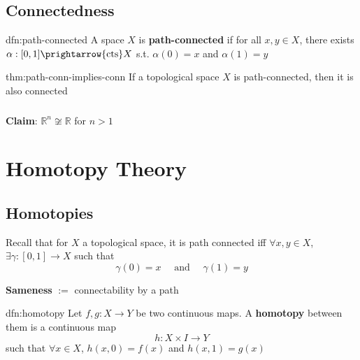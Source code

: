 \documentclass{article}
\begin{document}
\newpage
\subsection{Connectedness}

\begin{dfn}{dfn:path-connected}{}
    A space $X$ is \textbf{path-connected} if for all $x, y\in X$, there exists $\alpha : [0,1] \prightarrow{\text{cts}} X$ s.t. $\alpha(0) = x$ and $\alpha(1) = y$
\end{dfn}

\begin{thm}[]{thm:path-conn-implies-conn}{}
    If a topological space $X$ is path-connected, then it is also connected
\end{thm}

\subsubsection{}
\textbf{Claim}: $\mathbb{R}^{n} \not\cong \mathbb{R}$ for $n > 1$

\newpage
\section{Homotopy Theory}

\subsection{Homotopies}

Recall that for $X$ a topological space, it is path connected iff $\forall x, y\in X$, $\exists \gamma : [0,1] \to X$ such that
\[\gamma(0) = x \quad \text{ and } \quad \gamma(1) = y\]

\textbf{Sameness} $:=$ connectability by a path

\begin{dfn}[Homotopy]{dfn:homotopy}{}
    Let $f, g : X \to Y$ be two continuous maps. A \textbf{homotopy} between them is a continuous map
    \[h : X \times I \to Y\]
    such that $\forall x\in X$, $h(x,0) = f(x)$ and $h(x, 1) = g(x)$
\end{dfn}
\end{document}
